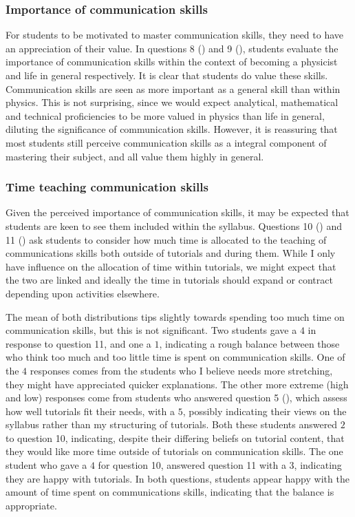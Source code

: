 \subsubsection{Importance of communication skills}\label{sec:comm-value}

For students to be motivated to master communication skills, they need to have an appreciation of their value. In questions 8 () and 9 (), students evaluate the importance of communication skills within the context of becoming a physicist and life in general respectively. It is clear that students do value these skills. Communication skills are seen as more important as a general skill than within physics. This is not surprising, since we would expect analytical, mathematical and technical proficiencies to be more valued in physics than life in general, diluting the significance of communication skills. However, it is reassuring that most students still perceive communication skills as a integral component of mastering their subject, and all value them highly in general.

\subsubsection{Time teaching communication skills}\label{sec:comm-time}

Given the perceived importance of communication skills, it may be expected that students are keen to see them included within the syllabus. Questions 10 () and 11 () ask students to consider how much time is allocated to the teaching of communications skills both outside of tutorials and during them. While I only have influence on the allocation of time within tutorials, we might expect that the two are linked and ideally the time in tutorials should expand or contract depending upon activities elsewhere.

The mean of both distributions tips slightly towards spending too much time on communication skills, but this is not significant. Two students gave a $4$ in response to question 11, and one a $1$, indicating a rough balance between those who think too much and too little time is spent on communication skills. One of the $4$ responses comes from the students who I believe needs more stretching, they might have appreciated quicker explanations. The other more extreme (high and low) responses come from students who answered question 5 (), which assess how well tutorials fit their needs, with a $5$, possibly indicating their views on the syllabus rather than my structuring of tutorials. Both these students answered $2$ to question 10, indicating, despite their differing beliefs on tutorial content, that they would like more time outside of tutorials on communication skills. The one student who gave a $4$ for question 10, answered question 11 with a $3$, indicating they are happy with tutorials. In both questions, students appear happy with the amount of time spent on communications skills, indicating that the balance is appropriate.

